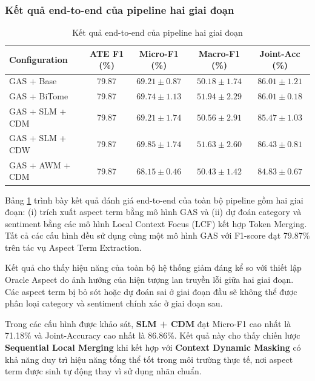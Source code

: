 \subsubsection*{Kết quả end-to-end của pipeline hai giai đoạn }
\begin{table}[H]
\centering
\small
\caption{Kết quả end-to-end của pipeline hai giai đoạn}
\label{tab:end2end_results}
\begin{tabular}{@{}lcccc@{}}
\toprule
\textbf{Configuration}
&
\textbf{ATE F1 (\%)}
&
\textbf{Micro-F1 (\%)}
&
\textbf{Macro-F1 (\%)}
&
\textbf{Joint-Acc (\%)} \\
\midrule

GAS + Base
& 79.87 & $69.21 \pm 0.87$ & $50.18 \pm 1.74$ & $86.01 \pm 1.21$ \\

GAS + BiTome
& 79.87 & $69.74 \pm 1.13$ & $\mathbf{51.94 \pm 2.29}$ & $86.01 \pm 0.18$ \\

GAS + SLM + CDM
& 79.87 & $69.21 \pm 1.74$ & $50.56 \pm 2.91$ & $85.47 \pm 1.03$ \\

GAS + SLM + CDW
& 79.87 & $\mathbf{69.85 \pm 1.74}$ & $51.63 \pm 2.60$ & $\mathbf{86.43 \pm 0.81}$ \\

GAS + AWM + CDM
& 79.87 & $68.15 \pm 0.46$ & $50.43 \pm 1.42$ & $84.83 \pm 0.67$ \\

\bottomrule
\end{tabular}
\end{table}
Bảng \ref{tab:end2end_results} trình bày kết quả đánh giá end-to-end của toàn bộ pipeline gồm hai giai đoạn: (i) trích xuất aspect term bằng mô hình GAS và (ii) dự đoán category và sentiment bằng các mô hình Local Context Focus (LCF) kết hợp Token Merging. Tất cả các cấu hình đều sử dụng cùng một mô hình GAS với F1-score đạt 79.87\% trên tác vụ Aspect Term Extraction.

Kết quả cho thấy hiệu năng của toàn bộ hệ thống giảm đáng kể so với thiết lập Oracle Aspect do ảnh hưởng của hiện tượng lan truyền lỗi giữa hai giai đoạn. Các aspect term bị bỏ sót hoặc dự đoán sai ở giai đoạn đầu sẽ không thể được phân loại category và sentiment chính xác ở giai đoạn sau.

Trong các cấu hình được khảo sát, \textbf{SLM + CDM} đạt Micro-F1 cao nhất là 71.18\% và Joint-Accuracy cao nhất là 86.86\%. Kết quả này cho thấy chiến lược \textbf{Sequential Local Merging} khi kết hợp với \textbf{Context Dynamic Masking} có khả năng duy trì hiệu năng tổng thể tốt trong môi trường thực tế, nơi aspect term được sinh tự động thay vì sử dụng nhãn chuẩn.

